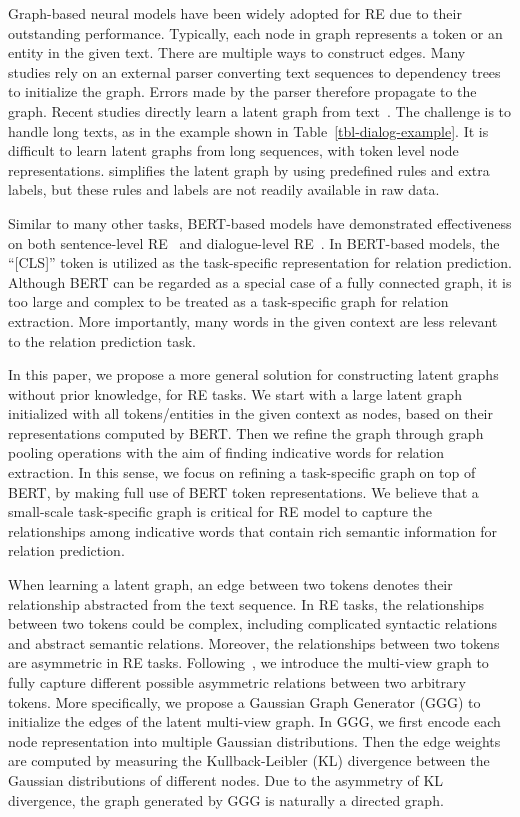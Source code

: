 \documentclass[letterpaper]{article} \usepackage{aaai21}  \usepackage{times}  \usepackage{helvet} \usepackage{courier}  \usepackage[hyphens]{url}  \usepackage{graphicx} \urlstyle{rm} \def\UrlFont{\rm}  \usepackage{graphicx}  \usepackage{natbib}  \usepackage{caption}
\begin{document}
Graph-based neural models have been widely adopted for RE due to their outstanding performance. Typically, each node in graph represents a token or an entity in the given text. There are multiple ways to construct edges. Many studies rely on an external parser converting text sequences to dependency trees to initialize the graph. Errors made by the parser therefore propagate to the graph. Recent studies directly learn a latent graph from  text~\cite{christopoulou-etal-2018-walk,christopoulou2019connecting,hashimoto-tsuruoka-2017-neural}. The challenge is to handle long texts, as in the example shown in Table~\ref{tbl-dialog-example}. It is difficult to learn latent graphs from long sequences, with token level node representations. \citet{christopoulou2019connecting} simplifies the latent graph by using predefined rules and extra labels, but these rules and labels are not readily available in raw data. 


Similar to many other tasks, BERT-based models have demonstrated effectiveness on both sentence-level RE~\cite{wu2019enriching,joshi2020spanbert} and dialogue-level RE~\cite{yu-etal-2020-dialogue}. In BERT-based models, the ``[CLS]'' token is utilized as the task-specific representation for relation prediction. Although BERT can be regarded as a special case of a fully connected graph, it is too large and complex to be treated as a task-specific graph for relation extraction. More importantly, many words in the given context are less relevant to the relation prediction task.


In this paper, we propose a more general solution for constructing latent graphs without prior knowledge, for RE tasks. We start with a large latent graph initialized with all tokens/entities in the given context as nodes, based on their representations computed by BERT. Then we refine the graph through graph pooling operations with the aim of finding indicative words for relation extraction. In this sense, we focus on refining a task-specific graph on top of  BERT, by making full use of BERT token representations. We believe that a small-scale task-specific graph is critical for RE model to capture the relationships among indicative words that contain rich semantic information for relation prediction.  



When learning a latent graph, an edge between two tokens denotes their relationship abstracted from the text sequence. In RE tasks, the relationships between two tokens could be complex, including complicated syntactic relations and abstract semantic relations. Moreover, the relationships between two tokens are asymmetric in RE tasks. Following~\citet{10.1145/2806416.2806502}, we introduce the multi-view graph to fully capture different possible asymmetric relations between two arbitrary tokens. More specifically, we propose a Gaussian Graph Generator (GGG) to initialize the edges of the latent multi-view graph. In GGG, we first encode each node representation into multiple Gaussian distributions. Then the edge weights are computed by measuring the Kullback-Leibler (KL) divergence between the Gaussian distributions of different nodes. Due to the asymmetry of KL divergence, the graph generated by GGG is naturally a directed graph.
\end{document}
